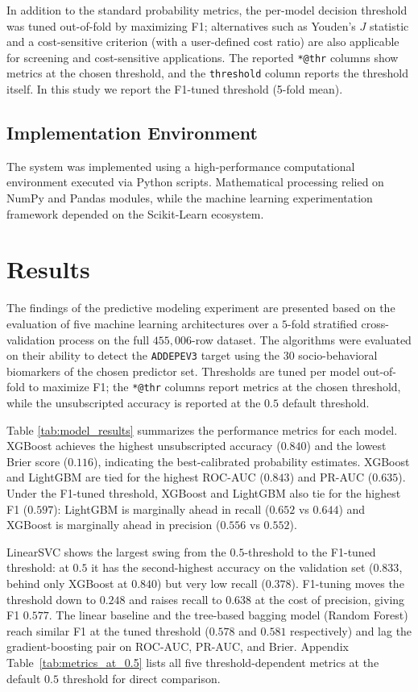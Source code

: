\documentclass[conference]{IEEEtran}
\begin{document}
In addition to the standard probability metrics, the per-model decision threshold was tuned out-of-fold by maximizing F1; alternatives such as Youden's $J$ statistic and a cost-sensitive criterion (with a user-defined cost ratio) are also applicable for screening and cost-sensitive applications. The reported \texttt{*@thr} columns show metrics at the chosen threshold, and the \texttt{threshold} column reports the threshold itself. In this study we report the F1-tuned threshold (5-fold mean). %

\subsection{Implementation Environment}
The system was implemented using a high-performance computational environment executed via Python scripts. Mathematical processing relied on NumPy \cite{harris2020array} %
and Pandas \cite{mckinney2010pandas} %
modules, while the machine learning experimentation framework depended on the Scikit-Learn \cite{scikit-learn} %
ecosystem.


\section{Results}

The findings of the predictive modeling experiment are presented based on the evaluation of five machine learning architectures over a $5$-fold stratified cross-validation process on the full $455{,}006$-row dataset. The algorithms were evaluated on their ability to detect the \texttt{ADDEPEV3} target using the $30$ socio-behavioral biomarkers of the chosen predictor set. Thresholds are tuned per model out-of-fold to maximize F1; the \texttt{*@thr} columns report metrics at the chosen threshold, while the unsubscripted accuracy is reported at the $0.5$ default threshold.

Table \ref{tab:model_results} summarizes the performance metrics for each model. XGBoost achieves the highest unsubscripted accuracy ($0.840$) and the lowest Brier score ($0.116$), indicating the best-calibrated probability estimates. XGBoost and LightGBM are tied for the highest ROC-AUC ($0.843$) and PR-AUC ($0.635$). Under the F1-tuned threshold, XGBoost and LightGBM also tie for the highest F1 ($0.597$): LightGBM is marginally ahead in recall ($0.652$ vs $0.644$) and XGBoost is marginally ahead in precision ($0.556$ vs $0.552$). 

LinearSVC shows the largest swing from the $0.5$-threshold to the F1-tuned threshold: at $0.5$ it has the second-highest accuracy on the validation set ($0.833$, behind only XGBoost at $0.840$) but very low recall ($0.378$). F1-tuning moves the threshold down to $0.248$ and raises recall to $0.638$ at the cost of precision, giving F1 $0.577$. The linear baseline and the tree-based bagging model (Random Forest) reach similar F1 at the tuned threshold ($0.578$ and $0.581$ respectively) and lag the gradient-boosting pair on ROC-AUC, PR-AUC, and Brier. Appendix Table~\ref{tab:metrics_at_0.5} lists all five threshold-dependent metrics at the default $0.5$ threshold for direct comparison.
\end{document}
